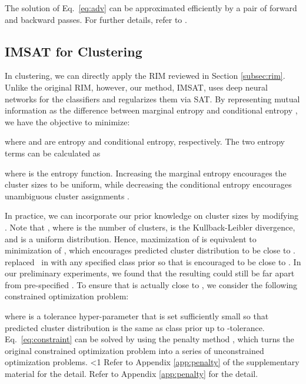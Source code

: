 \documentclass{article}
\theoremstyle{plain}
\newcounter{long}
\begin{document}
The solution of Eq.~\eqref{eq:adv} can be approximated efficiently by a pair of forward and backward passes. For further details, refer to \citet{miyato2015distributional}.



\subsection{IMSAT for Clustering} 
\label{subsec:adapt_clustering}
In clustering, we can directly apply the RIM \citep{krause2010discriminative} reviewed in Section \ref{subsec:rim}. Unlike the original RIM, however, our method, IMSAT, uses deep neural networks for the classifiers and regularizes them via SAT.
By representing mutual information as the difference between marginal entropy and conditional entropy \citep{cover2012elements}, we have the objective to minimize:

where  and  are entropy and conditional entropy, respectively. The two entropy terms can be calculated as

where  is the entropy function.
Increasing the marginal entropy  encourages the cluster sizes to be uniform, while decreasing the conditional entropy  encourages unambiguous cluster assignments \citep{heading1991unsupervised}.

In practice, we can incorporate our prior knowledge on cluster sizes by modifying  \citep{krause2010discriminative}. Note that , where  is the number of clusters,  is the Kullback-Leibler divergence, and  is a uniform distribution. 
Hence, maximization of  is equivalent to minimization of , which encourages predicted cluster distribution  to be close to .
\citet{krause2010discriminative} replaced~ in  with any specified class prior  so that  is encouraged to be close to .
In our preliminary experiments, we found that the resulting  could still be far apart from pre-specified .
To ensure that  is actually close to , we consider the following constrained optimization problem:

where  is a tolerance hyper-parameter that is set sufficiently small so that predicted cluster distribution  is the same as class prior  up to -tolerance. 
Eq.~\eqref{eq:constraint} can be solved by using the penalty method \citep{bertsekas1999nonlinear}, which turns the original constrained optimization problem into a series of unconstrained optimization problems.
\ifnum\value{long}<1
Refer to Appendix \ref{app:penalty} of the supplementary material for the detail. 
\else
Refer to Appendix \ref{app:penalty} for the detail. 
\fi
\end{document}
